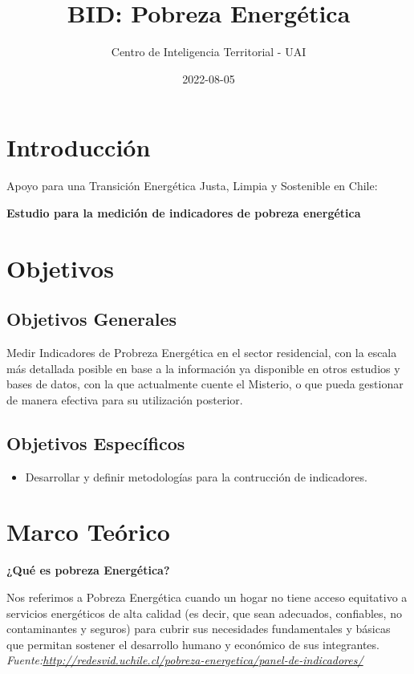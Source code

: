 \documentclass[
]{book}
\title{BID: Pobreza Energética}
\author{Centro de Inteligencia Territorial - UAI}
\date{2022-08-05}
\providecommand{\tightlist}{%
  \setlength{\itemsep}{0pt}\setlength{\parskip}{0pt}}
\begin{document}
\maketitle

{
\setcounter{tocdepth}{1}
\tableofcontents
}
\hypertarget{introducciuxf3n}{%
\chapter{Introducción}\label{introducciuxf3n}}

Apoyo para una Transición Energética Justa, Limpia y Sostenible en Chile:

\textbf{Estudio para la medición de indicadores de pobreza energética}

\hypertarget{objetivos}{%
\chapter{Objetivos}\label{objetivos}}

\hypertarget{objetivos-generales}{%
\section{Objetivos Generales}\label{objetivos-generales}}

Medir Indicadores de Probreza Energética en el sector residencial, con la escala más detallada posible en base a la información ya disponible en otros estudios y bases de datos, con la que actualmente cuente el Misterio, o que pueda gestionar de manera efectiva para su utilización posterior.

\hypertarget{objetivos-especuxedficos}{%
\section{Objetivos Específicos}\label{objetivos-especuxedficos}}

\begin{itemize}
\tightlist
\item
  Desarrollar y definir metodologías para la contrucción de indicadores.
\end{itemize}

\hypertarget{m_teorico}{%
\chapter{Marco Teórico}\label{m_teorico}}

\textbf{¿Qué es pobreza Energética?}

Nos referimos a Pobreza Energética cuando un hogar no tiene acceso equitativo a servicios energéticos de alta calidad (es decir, que sean adecuados, confiables, no contaminantes y seguros) para cubrir sus necesidades fundamentales y básicas que permitan sostener el desarrollo humano y económico de sus integrantes. \emph{Fuente:\url{http://redesvid.uchile.cl/pobreza-energetica/panel-de-indicadores/}}
\end{document}
